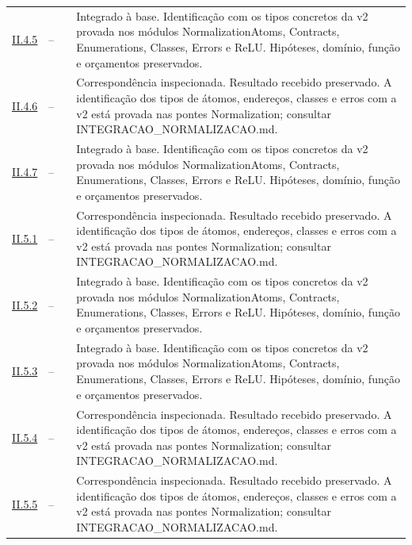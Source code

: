\begin{longtable}{@{}p{.11\linewidth}p{.09\linewidth}p{.09\linewidth}p{.59\linewidth}@{}}
\hyperref[map:normalizacao:4.5]{II.4.5} & -- & \pageref{map:normalizacao:4.5} & Integrado à base. Identificação com os tipos concretos da v2 provada nos módulos NormalizationAtoms, Contracts, Enumerations, Classes, Errors e ReLU. Hipóteses, domínio, função e orçamentos preservados.\\[4pt]
\hyperref[map:normalizacao:4.6]{II.4.6} & -- & \pageref{map:normalizacao:4.6} & Correspondência inspecionada. Resultado recebido preservado. A identificação dos tipos de átomos, endereços, classes e erros com a v2 está provada nas pontes Normalization; consultar INTEGRACAO\_NORMALIZACAO.md.\\[4pt]
\hyperref[map:normalizacao:4.7]{II.4.7} & -- & \pageref{map:normalizacao:4.7} & Integrado à base. Identificação com os tipos concretos da v2 provada nos módulos NormalizationAtoms, Contracts, Enumerations, Classes, Errors e ReLU. Hipóteses, domínio, função e orçamentos preservados.\\[4pt]
\hyperref[map:normalizacao:5.1]{II.5.1} & -- & \pageref{map:normalizacao:5.1} & Correspondência inspecionada. Resultado recebido preservado. A identificação dos tipos de átomos, endereços, classes e erros com a v2 está provada nas pontes Normalization; consultar INTEGRACAO\_NORMALIZACAO.md.\\[4pt]
\hyperref[map:normalizacao:5.2]{II.5.2} & -- & \pageref{map:normalizacao:5.2} & Integrado à base. Identificação com os tipos concretos da v2 provada nos módulos NormalizationAtoms, Contracts, Enumerations, Classes, Errors e ReLU. Hipóteses, domínio, função e orçamentos preservados.\\[4pt]
\hyperref[map:normalizacao:5.3]{II.5.3} & -- & \pageref{map:normalizacao:5.3} & Integrado à base. Identificação com os tipos concretos da v2 provada nos módulos NormalizationAtoms, Contracts, Enumerations, Classes, Errors e ReLU. Hipóteses, domínio, função e orçamentos preservados.\\[4pt]
\hyperref[map:normalizacao:5.4]{II.5.4} & -- & \pageref{map:normalizacao:5.4} & Correspondência inspecionada. Resultado recebido preservado. A identificação dos tipos de átomos, endereços, classes e erros com a v2 está provada nas pontes Normalization; consultar INTEGRACAO\_NORMALIZACAO.md.\\[4pt]
\hyperref[map:normalizacao:5.5]{II.5.5} & -- & \pageref{map:normalizacao:5.5} & Correspondência inspecionada. Resultado recebido preservado. A identificação dos tipos de átomos, endereços, classes e erros com a v2 está provada nas pontes Normalization; consultar INTEGRACAO\_NORMALIZACAO.md.\\[4pt]

\end{longtable}
